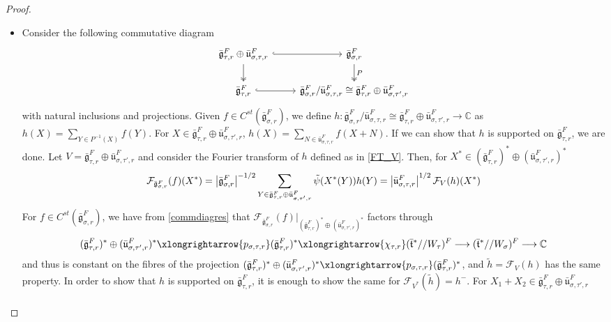 \documentclass[11 pt]{article}
\numberwithin{equation}{subsection}
\theoremstyle{definition}
\theoremstyle{remark}
\theoremstyle{conjecture}
\newcommand{\bt}{\bar{\mathfrak t}}
\newcommand{\bg}{\bar{\mathfrak g}}
\newcommand{\bu}{\bar{\mathfrak u}}
\newcommand{\C}{\mathbb C}
\newcommand{\mcF}{\mathcal F}
\begin{document}
\begin{proof}
\begin{itemize}
    \item[(3)] Consider the following commutative diagram 
    \begin{equation*}
        \begin{tikzcd}
            \bg_{\tau,r}^F\oplus \bu_{\sigma,\tau,r}^F \arrow[hookrightarrow]{r}\arrow[twoheadrightarrow]{d}& \bg_{\sigma,r}^F\arrow[twoheadrightarrow]{d}{P}\\
            \bg_{\tau,r}^F\arrow[hookrightarrow]{r}&\bg_{\sigma,r}^F/\bu_{\sigma,\tau,r}^F\cong \bg_{\tau,r}^F\oplus \bu_{\sigma,\tau',r}^F
        \end{tikzcd}
    \end{equation*}
    with natural inclusions and projections. Given $f \in C^{st}(\bg_{\sigma,r}^F)$, we define $h:\bg_{\sigma,r}^F/\bu_{\sigma,\tau,r}^F\cong \bg_{\tau,r}^F\oplus \bu_{\sigma,\tau',r}^F \longrightarrow \C$ as $h(X)= \sum_{Y \in P^{-1}(X)}f(Y)$. For $X \in \bg_{\tau,r}^F\oplus \bu_{\sigma,\tau',r}^F$, $h(X) = \sum_{N \in\bu_{\sigma,\tau,r}^F} f(X+N)$. If we can show that $h$ is supported on $\bg_{\tau,r}^F$, we are done. Let $V=\bg_{\tau,r}^F\oplus \bu_{\sigma,\tau',r}^F$ and consider the Fourier transform of $h$ defined as in \eqref{FT_V}. Then, for $X^*\in (\bg_{\tau,r}^F)^*\oplus (\bu_{\sigma,\tau',r}^F)^* $ 
    \begin{equation*}
                \mcF_{\bg_{\sigma,r}^F}(f)(X^*)=\left|\bg_{\sigma,r}^F\right|^{-1/2}\sum_{Y\in \bg_{\tau,r}^F\oplus \bu_{\sigma,\tau',r}^F}\Tilde\psi( X^*(Y))h(Y)= \left|\bu_{\sigma,\tau,r}^F\right|^{1/2}\mcF_V(h)(X^*)
    \end{equation*}
     For $f \in C^{st}(\bg_{\sigma,r}^F) $, we have  from \eqref{commdiagres} that $\mcF_{\bg_{\sigma,r}^F}(f)|_{(\bg_{\tau,r}^F)^*\oplus (\bu_{\sigma,\tau',r}^F)^*}$ factors through 
    \begin{equation*}
        (\bg_{\tau,r}^F)^*\oplus (\bu_{\sigma,\tau',r}^F)^*\xlongrightarrow{p_{\sigma,\tau,r}} (\bg_{\tau,r}^F)^* \xlongrightarrow{\chi_{\tau,r}}(\bt^*//W_\tau)^F \longrightarrow (\bt^*//W_\sigma)^F \longrightarrow\C 
    \end{equation*}
    and thus is constant on the fibres of the projection $ (\bg_{\tau,r}^F)^*\oplus (\bu_{\sigma,\tau',r}^F)^*\xlongrightarrow{p_{\sigma,\tau,r}} (\bg_{\tau,r}^F)^*$, and $\tilde h=\mcF_V(h)$ has the same property. In order to show that $h$ is supported on $\bg_{\tau,r}^F$, it is enough to show the same for $\mcF_{V^*}(\tilde h)=h^-$. For $X_1+X_2 \in \bg_{\tau,r}^F\oplus \bu_{\sigma,\tau',r}^F$
    \begin{align*}

\end{align*}
\end{itemize}
\end{proof}
\end{document}
